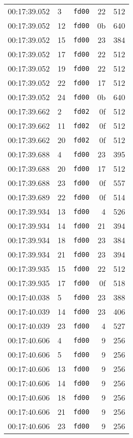 \documentclass{article}
\begin{document}
\begin{longtable}{lllrr}
00:17:39.052 & 3 & \texttt{fd00} & 22 & 512 \\
00:17:39.052 & 12 & \texttt{fd00} & 0b & 640 \\
00:17:39.052 & 15 & \texttt{fd00} & 23 & 384 \\
00:17:39.052 & 17 & \texttt{fd00} & 22 & 512 \\
00:17:39.052 & 19 & \texttt{fd00} & 22 & 512 \\
00:17:39.052 & 22 & \texttt{fd00} & 17 & 512 \\
00:17:39.052 & 24 & \texttt{fd00} & 0b & 640 \\
00:17:39.662 & 2 & \texttt{fd02} & 0f & 512 \\
00:17:39.662 & 11 & \texttt{fd02} & 0f & 512 \\
00:17:39.662 & 20 & \texttt{fd02} & 0f & 512 \\
00:17:39.688 & 4 & \texttt{fd00} & 23 & 395 \\
00:17:39.688 & 20 & \texttt{fd00} & 17 & 512 \\
00:17:39.688 & 23 & \texttt{fd00} & 0f & 557 \\
00:17:39.689 & 22 & \texttt{fd00} & 0f & 514 \\
00:17:39.934 & 13 & \texttt{fd00} & 4 & 526 \\
00:17:39.934 & 14 & \texttt{fd00} & 21 & 394 \\
00:17:39.934 & 18 & \texttt{fd00} & 23 & 384 \\
00:17:39.934 & 21 & \texttt{fd00} & 23 & 394 \\
00:17:39.935 & 15 & \texttt{fd00} & 22 & 512 \\
00:17:39.935 & 17 & \texttt{fd00} & 0f & 518 \\
00:17:40.038 & 5 & \texttt{fd00} & 23 & 388 \\
00:17:40.039 & 14 & \texttt{fd00} & 23 & 406 \\
00:17:40.039 & 23 & \texttt{fd00} & 4 & 527 \\
00:17:40.606 & 4 & \texttt{fd00} & 9 & 256 \\
00:17:40.606 & 5 & \texttt{fd00} & 9 & 256 \\
00:17:40.606 & 13 & \texttt{fd00} & 9 & 256 \\
00:17:40.606 & 14 & \texttt{fd00} & 9 & 256 \\
00:17:40.606 & 18 & \texttt{fd00} & 9 & 256 \\
00:17:40.606 & 21 & \texttt{fd00} & 9 & 256 \\
00:17:40.606 & 23 & \texttt{fd00} & 9 & 256 \\

\end{longtable}
\end{document}
